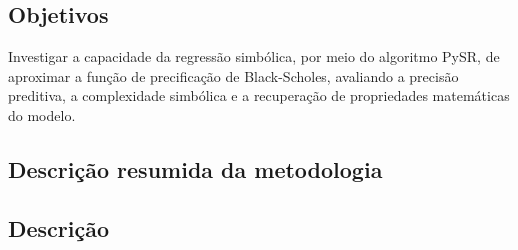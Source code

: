 \subsection{Objetivos}
Investigar a capacidade da regressão simbólica, por meio do algoritmo PySR, de aproximar a função de precificação de Black-Scholes, avaliando a precisão preditiva, a complexidade simbólica e a recuperação de propriedades matemáticas do modelo.

\subsection{Descrição resumida da metodologia}

\subsection{Descrição}
